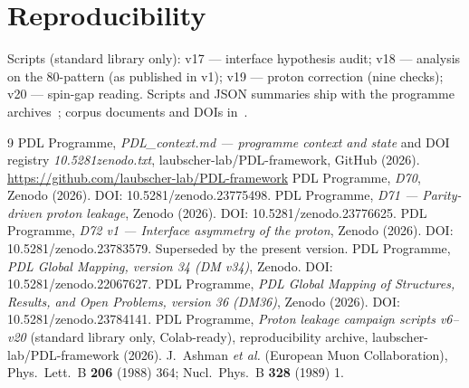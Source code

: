 \documentclass[11pt,a4paper]{article}
\begin{document}
\section{Reproducibility}
Scripts (standard library only): v17 --- interface hypothesis audit; v18 --- analysis on the 80-pattern (as published in v1); v19 --- proton correction (nine checks); v20 --- spin-gap reading. Scripts and JSON summaries ship with the programme archives~\cite{scripts}; corpus documents and DOIs in~\cite{pdlcontext,d70,d71,d72v1,dm34,dm36}.

\begin{thebibliography}{9}
 PDL Programme, \emph{PDL\_context.md --- programme context and state} and DOI registry \emph{10.5281zenodo.txt}, laubscher-lab/PDL-framework, GitHub (2026). \url{https://github.com/laubscher-lab/PDL-framework}
 PDL Programme, \emph{D70}, Zenodo (2026). DOI: 10.5281/zenodo.23775498.
 PDL Programme, \emph{D71 --- Parity-driven proton leakage}, Zenodo (2026). DOI: 10.5281/zenodo.23776625.
 PDL Programme, \emph{D72 v1 --- Interface asymmetry of the proton}, Zenodo (2026). DOI: 10.5281/zenodo.23783579. Superseded by the present version.
 PDL Programme, \emph{PDL Global Mapping, version 34 (DM v34)}, Zenodo. DOI: 10.5281/zenodo.22067627.
 PDL Programme, \emph{PDL Global Mapping of Structures, Results, and Open Problems, version 36 (DM36)}, Zenodo (2026). DOI: 10.5281/zenodo.23784141.
 PDL Programme, \emph{Proton leakage campaign scripts v6--v20} (standard library only, Colab-ready), reproducibility archive, laubscher-lab/PDL-framework (2026).
 J.~Ashman \emph{et al.} (European Muon Collaboration), Phys.\ Lett.\ B \textbf{206} (1988) 364; Nucl.\ Phys.\ B \textbf{328} (1989) 1.
\end{thebibliography}
\end{document}

